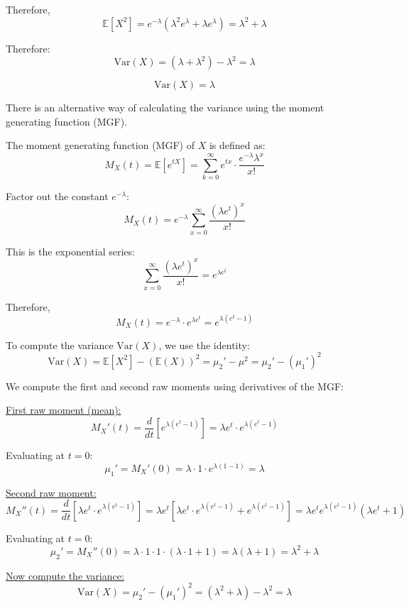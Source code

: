 \documentclass[twoside]{book}
\begin{document}
\begin{itemize}
Therefore,
\[
\mathbb{E}[X^2] = e^{-\lambda} \left( \lambda^2 e^{\lambda} + \lambda e^{\lambda} \right) = \lambda^2 + \lambda
\]

  Therefore:
    \[
    \text{Var}(X) = (\lambda + \lambda^2) - \lambda^2 = \lambda
    \]

    \begin{textbox}
        \[
    \text{Var}(X) = \lambda
    \]
    \end{textbox}

    \vspace{3mm}
    
    There is an alternative way of calculating the variance using the moment generating function (MGF). 
    
    The moment generating function (MGF) of \( X \) is defined as:
    \[
M_X(t) = \mathbb{E}[e^{tX}] = \sum_{k=0}^{\infty} e^{t x} \cdot \frac{e^{-\lambda} \lambda^x}{x!}
\]

Factor out the constant \( e^{-\lambda} \):
\[
M_X(t) = e^{-\lambda} \sum_{x=0}^{\infty} \frac{(\lambda e^t)^x}{x!}
\]

This is the exponential series:
\[
\sum_{x=0}^{\infty} \frac{(\lambda e^t)^x}{x!} = e^{\lambda e^t}
\]

Therefore,
\[
M_X(t) = e^{-\lambda} \cdot e^{\lambda e^t} = e^{\lambda(e^t - 1)}
\]

To compute the variance \( \mathrm{Var}(X) \), we use the identity:
\[
\mathrm{Var}(X) = \mathbb{E}[X^2] - (\mathbb{E}(X))^2 = \mu_2' - \mu^2 = \mu_2' - (\mu_1')^2
\]

We compute the first and second raw moments using derivatives of the MGF:

\underline{First raw moment (mean):}
\[
M_X'(t) = \frac{d}{dt} \left[ e^{\lambda(e^t - 1)} \right] 
= \lambda e^t \cdot e^{\lambda(e^t - 1)}
\]

Evaluating at \( t = 0 \):
\[
\mu_1' = M_X'(0) = \lambda \cdot 1 \cdot e^{\lambda(1 - 1)} = \lambda
\]

\underline{Second raw moment:}
\[
M_X''(t) = \frac{d}{dt} \left[ \lambda e^t \cdot e^{\lambda(e^t - 1)} \right]
= \lambda e^t \left[ \lambda e^t \cdot e^{\lambda(e^t - 1)} + e^{\lambda(e^t - 1)} \right]
= \lambda e^t e^{\lambda(e^t - 1)} (\lambda e^t + 1)
\]

Evaluating at \( t = 0 \):
\[
\mu_2' = M_X''(0) = \lambda \cdot 1 \cdot 1 \cdot (\lambda \cdot 1 + 1) = \lambda(\lambda + 1) = \lambda^2 + \lambda
\]

\underline{Now compute the variance:}
\[
\mathrm{Var}(X) = \mu_2' - (\mu_1')^2 = (\lambda^2 + \lambda) - \lambda^2 = \lambda
\]
\end{itemize}
\end{document}
